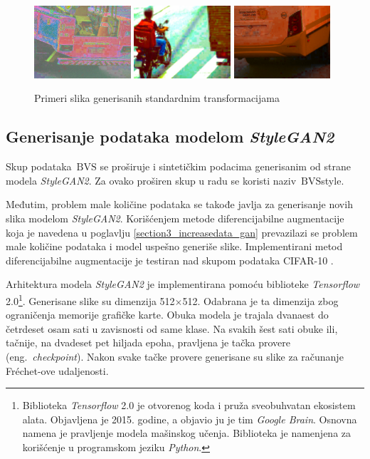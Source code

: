 \documentclass[12pt,oneside]{memoir}
\newcommand{\bvs}{\ensuremath{\,\textrm{BVS}}}
\begin{document}
\begin{figure}[!htbp]
  \includegraphics[width=0.32\textwidth]{matfmaster/glava4/basic_aug/7.jpg}
  \includegraphics[width=0.32\textwidth]{matfmaster/glava4/basic_aug/8.jpg}
  \includegraphics[width=0.32\textwidth]{matfmaster/glava4/basic_aug/9.jpg}
\caption{Primeri slika generisanih standardnim transformacijama}\label{fig:basic_aug}
\end{figure}

 
\clearpage
\subsection{Generisanje podataka modelom \textit{StyleGAN2}}

Skup podataka \bvs{} se proširuje i sintetičkim podacima generisanim od strane modela \textit{StyleGAN2}. Za ovako proširen skup u radu se koristi naziv \bvs{style}. 

Međutim, problem male količine podataka se takođe javlja za generisanje novih slika modelom \textit{StyleGAN2}. Korišćenjem metode diferencijabilne augmentacije koja je navedena u poglavlju \ref{section3_increasedata_gan} prevazilazi se problem male količine podataka i model uspešno generiše slike. Implementirani metod diferencijabilne augmentacije je testiran nad skupom podataka CIFAR-10 \cite{2020diffaugment_report}.

Arhitektura modela \textit{StyleGAN2} je implementirana pomoću biblioteke \textit{Tensorflow} 2.0\footnote{Biblioteka \textit{Tensorflow} 2.0 je otvorenog koda i pruža sveobuhvatan ekosistem alata. Objavljena je 2015. godine, a objavio ju je tim \textit{Google Brain}. Osnovna namena je pravljenje modela mašinskog učenja. Biblioteka je namenjena za korišćenje u programskom jeziku \textit{Python}.}.
Generisane slike su dimenzija 512\(\times\)512. Odabrana je ta dimenzija zbog ograničenja memorije grafičke karte. Obuka modela je trajala dvanaest do četrdeset osam sati u zavisnosti od same klase. Na svakih šest sati obuke ili, tačnije, na dvadeset pet hiljada epoha, pravljena je tačka provere (eng.~\textit{checkpoint}). Nakon svake tačke provere generisane su slike za računanje Fréchet-ove udaljenosti.
\end{document}
